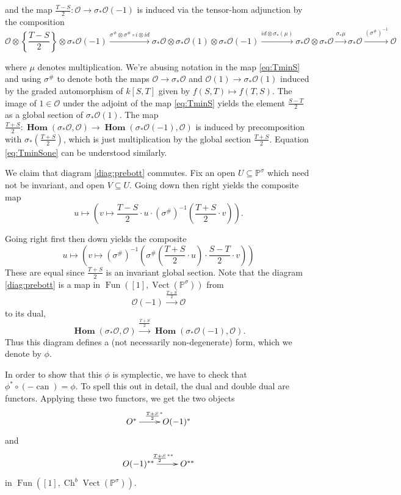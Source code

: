 \documentclass[edeposit,fullpage]{uiucthesis2009}
\newcommand{\mbb}{\mathbb}
\newcommand{\mc}{\mathcal}
\DeclareMathOperator{\can}{can}
\DeclareMathOperator{\iHom}{\mathbf{Hom}}
\DeclareMathOperator{\Ch}{Ch}
\DeclareMathOperator{\Fun}{Fun}
\DeclareMathOperator{\Vect}{Vect}
\theoremstyle{plain}
\numberwithin{lemma}{section}
\theoremstyle{definition}
\begin{document}
and the map  $\frac{T-S}{2} : \mc O \rightarrow \sigma_*\mc
O(-1)$ is induced via the tensor-hom adjunction by the composition 
\begin{equation}\label{eq:TminS}
\mc O \otimes \left\{\frac{T-S}{2}\right\} \otimes \sigma_* \mc O(-1)
\xrightarrow{\sigma^\# \otimes  \sigma^\# \circ i \otimes id}
\sigma_*\mc O \otimes \sigma_*\mc O(1) \otimes \sigma_*\mc O(-1)  
\xrightarrow{ id \otimes \sigma_*(\mu)} \sigma_*\mc O \otimes \sigma_*\mc
O \xrightarrow{\sigma_*\mu} \sigma_*\mc O
\xrightarrow{(\sigma^\#)^{-1}} \mc O
\end{equation}

where $\mu$ denotes multiplication. We're abusing notation
in the map \eqref{eq:TminS} and using $\sigma^\#$ to denote both the maps $\mc O \rightarrow
\sigma_* \mc O$ and $\mc O(1) \rightarrow
\sigma_* \mc O(1)$ induced by the graded automorphism of $k[S,T]$
given by $f(S,T) \mapsto f(T,S)$. The image of $1 \in \mc O$ under the
adjoint of the map \eqref{eq:TminS}
 yields the element $\frac{S-T}{2}$ as a global section of
$\sigma_*\mc O(1)$. The map $\frac{T+S}{2} :
\iHom(\sigma_* \mc O, \mc O) \rightarrow \iHom(\sigma_* \mc O(-1),\mc
O)$ is induced by precomposition with $\sigma_*(\frac{T+S}{2})$, which is just
multiplication by the global section $\frac{T+S}{2}$. Equation
\eqref{eq:TminSone} can be understood similarly.

We
claim that diagram \ref{diag:prebott} commutes. Fix an open $U
\subseteq \mbb P^\sigma$ which need not be invariant, and open $V
\subseteq U$. Going down then right yields the
composite map
\[
u \mapsto (v \mapsto \frac{T-S}{2} \cdot u \cdot
(\sigma^\#)^{-1}\left(\frac{T+S}{2}\cdot v\right)).
\]

Going right first then down yields the composite
\[
u \mapsto (v \mapsto (\sigma^\#)^{-1}(\sigma^\#(\frac{T+S}{2} \cdot u
)\cdot \frac{S-T}{2}\cdot v))
\]
These are equal since $\frac{T+S}{2}$ is an invariant global
section. Note that the diagram \ref{diag:prebott} is a map in
$\Fun([1],\Vect(\mbb P^\sigma))$ from 
\[
\mc O(-1) \xrightarrow{\frac{T+S}{2}} \mc O
\]
to its dual,
\[
\iHom(\sigma_*\mc
  O,\mc O) \xrightarrow{\frac{T+S}{2}}  \iHom(\sigma_* \mc O(-1),\mc O).
\]
Thus this diagram defines a (not necessarily non-degenerate) form,
which we denote by $\phi$. 

In order to show that this $\phi$ is symplectic, we have to check that
$\phi^* \circ (-\can) = \phi$. To spell this out in detail, the dual
and double dual are functors. Applying these two functors, we get the
two objects
\[
\xymatrix{O^* \ar[r]^{\frac{T+S}{2}^\ast} & O(-1)^*}
\]
and
\[
\xymatrix{O(-1)^{\ast\ast} \ar[r]^{\frac{T+S}{2}^{\ast\ast}} & O^{\ast\ast}}
\]
in  $\Fun([1],\Ch^b\Vect(\mbb P^\sigma))$.
\end{document}
